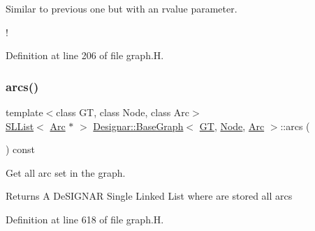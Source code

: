 Similar to previous one but with an rvalue parameter. 

! 

Definition at line 206 of file graph.\+H.

\mbox{\label{class_designar_1_1_base_graph_afeff075f6386a31a06a8211e5d11fe1a}} 
\subsubsection{\texorpdfstring{arcs()}{arcs()}}
{\footnotesize\ttfamily template$<$class GT, class Node, class Arc$>$ \\
\hyperlink{class_designar_1_1_s_l_list}{S\+L\+List}$<$ \hyperlink{namespace_designar_a3f55fb5513d62ff47cbc8f72b8e95d6f}{Arc} $\ast$ $>$ \hyperlink{class_designar_1_1_base_graph}{Designar\+::\+Base\+Graph}$<$ \hyperlink{demo-buildgraph_8_c_a3001c40d2c31ca87ed96cd7d1334a55e}{GT}, \hyperlink{namespace_designar_a5af326c65aa2bd26b26c410f2030d09e}{Node}, \hyperlink{namespace_designar_a3f55fb5513d62ff47cbc8f72b8e95d6f}{Arc} $>$\+::arcs (\begin{DoxyParamCaption}{ }\end{DoxyParamCaption}) const\hspace{0.3cm}{\ttfamily [inline]}}



Get all arc set in the graph. 

\begin{DoxyReturn}{Returns}
A De\+S\+I\+G\+N\+AR Single Linked List where are stored all arcs 
\end{DoxyReturn}


Definition at line 618 of file graph.\+H.

\mbox{\label{class_designar_1_1_base_graph_ac34a3b513973c2ed43067934f71ace28}} 

